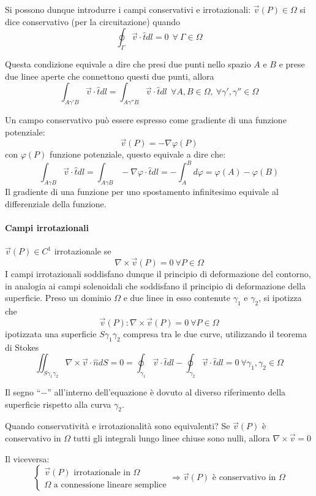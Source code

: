 Si possono dunque introdurre i campi conservativi e irrotazionali:
$\vec{v}(P) \in \Omega$ si dice conservativo (per la circuitazione) quando
$$
\oint_\Gamma \vec{v}\cdot\hat{t} dl = 0\ \ \forall\ \Gamma \in \Omega
$$

Questa condizione equivale a dire che presi due punti nello spazio $A$ e $B$ e prese due linee aperte che connettono questi due punti, allora
$$
\int_{A\gamma'B} \vec{v}\cdot\hat{t}dl = \int_{A\gamma''B} \vec{v}\cdot\hat{t}dl\ \ \forall A,B\in\Omega,\ \forall \gamma',\gamma'' \in \Omega
$$

Un campo conservativo può essere espresso come gradiente di una funzione potenziale:
$$
\vec{v}(P) = -\nabla\varphi(P)
$$
con $\varphi(P)$ funzione potenziale, questo equivale a dire che:
$$
\int_{A\gamma B} \vec{v}\cdot \hat{t} dl = \int_{A\gamma B} -\nabla\varphi\cdot\hat{t} dl =
-\int_{A}^B d\varphi = \varphi(A) - \varphi(B)
$$
Il gradiente di una funzione per uno spostamento infinitesimo equivale al differenziale della funzione.

\paragraph{Campi irrotazionali}
$\vec{v}(P) \in C^1$ irrotazionale se 
$$
\nabla\times \vec{v}(P) = 0\  \forall P \in \Omega
$$
I campi irrotazionali soddisfano dunque il principio di deformazione del contorno, in analogia
ai campi solenoidali che soddisfano il principio di deformazione della superficie.
Preso un dominio $\Omega$ e due linee in esso contenute $\gamma_1$ e $\gamma_2$,
si ipotizza che 
$$
\vec{v}(P) : \nabla\times\vec{v}(P) =0\ \forall P \in \Omega
$$
ipotizzata una superficie $S\gamma_1\gamma_2$ compresa tra le due curve, utilizzando
il teorema di Stokes
$$
\iint_{S\gamma_1\gamma_2} \nabla\times\vec{v}\cdot\hat{n}dS = 0 = \oint_{\gamma_1} \vec{v}\cdot\hat{t} dl - \oint_{\gamma_2} \vec{v}\cdot\hat{t}dl = 0\ \forall\gamma_1,\gamma_2\in \Omega
$$

Il segno ``$-$'' all'interno dell'equazione è dovuto al diverso riferimento della superficie rispetto alla
curva $\gamma_2$.

Quando conservatività e irrotazionalità sono equivalenti?
Se $\vec{v}(P)$ è conservativo in $\Omega $ tutti gli integrali lungo linee chiuse sono nulli, 
allora $\nabla\times\vec{v}=0$

Il viceversa:
$$
\begin{cases}
\vec{v}(P) \text{ irrotazionale in }\Omega \\
\Omega \text{ a connessione lineare semplice}
\end{cases}
\Rightarrow \vec{v}(P) \text{ è conservativo in }\Omega
$$

